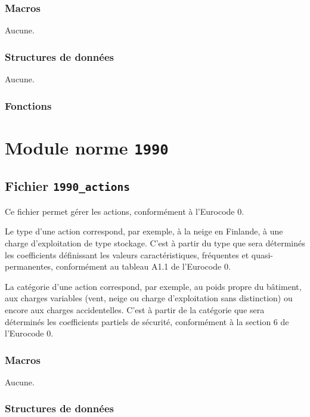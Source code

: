 \documentclass{article}
\begin{document}
\subsubsection{Macros}
Aucune.
\subsubsection{Structures de données}
Aucune.
\subsubsection{Fonctions}




\section{Module norme {\texttt{1990}}}
\subsection{Fichier {\texttt{1990\_actions}}}
Ce fichier permet gérer les actions, conformément à l'Eurocode 0.\par
Le type d'une action correspond, par exemple, à la neige en Finlande, à une charge d'exploitation de type stockage. C'est à partir du type que sera déterminés les coefficients définissant les valeurs caractéristiques, fréquentes et quasi-permanentes, conformément au tableau A1.1 de l'Eurocode 0.\par
La catégorie d'une action correspond, par exemple, au poids propre du bâtiment, aux charges variables (vent, neige ou charge d'exploitation sans distinction) ou encore aux charges accidentelles. C'est à partir de la catégorie que sera déterminés les coefficients partiels de sécurité, conformément à la section 6 de l'Eurocode 0.
\subsubsection{Macros}
Aucune.
\subsubsection{Structures de données}


\end{document}

